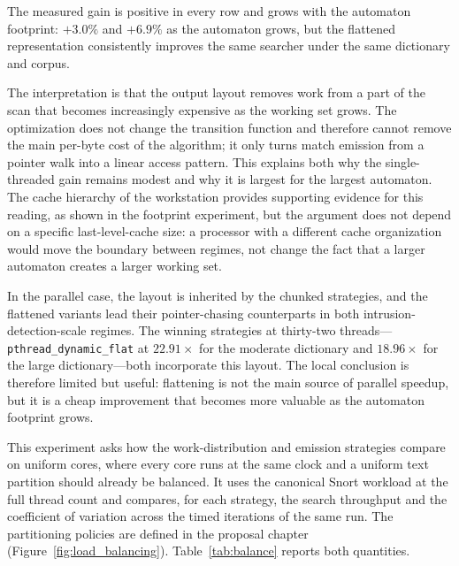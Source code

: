 The measured gain is positive in every row and grows with the automaton footprint:
$+3.0\%$
and $+6.9\%$
as the automaton grows, but the flattened representation consistently improves the
same searcher under the same dictionary and corpus.

The interpretation is that the output layout removes work from a part of the scan
that becomes increasingly expensive as the working set grows. The optimization
does not change the transition function and therefore cannot remove the main
per-byte cost of the algorithm; it only turns match emission from a pointer walk
into a linear access pattern. This explains both why the single-threaded gain
remains modest and why it is largest for the largest automaton. The cache
hierarchy of the workstation provides supporting evidence for this reading, as
shown in the footprint experiment, but the argument does not depend on a specific
last-level-cache size: a processor with a different cache organization would move
the boundary between regimes, not change the fact that a larger automaton creates a
larger working set.

In the parallel case, the layout is inherited by the chunked strategies, and the
flattened variants lead their pointer-chasing counterparts in both
intrusion-detection-scale regimes. The winning strategies at thirty-two
threads---\texttt{pthread\_\allowbreak dynamic\_\allowbreak flat} at
$22.91\times$ for the moderate dictionary and $18.96\times$ for the large
dictionary---both incorporate this layout. The local conclusion is therefore
limited but useful: flattening is not the main source of parallel speedup, but it
is a cheap improvement that becomes more valuable as the automaton footprint
grows.


This experiment asks how the work-distribution and emission strategies compare on
uniform cores, where every core runs at the same clock and a uniform text
partition should already be balanced. It uses the canonical Snort workload at the
full thread count and compares, for each strategy, the search throughput and the
coefficient of variation across the timed iterations of the same run. The
partitioning policies are defined in the proposal chapter
(Figure~\ref{fig:load_balancing}).
Table~\ref{tab:balance} reports both quantities.

